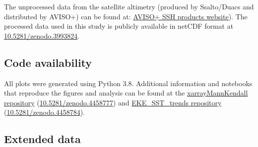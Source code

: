 \documentclass{nature}
\begin{document}
The unprocessed data from the satellite altimetry (produced by Ssalto/Duacs and distributed by AVISO+) can be found at: \href{https://www.aviso. altimetry.fr/en/data/products/sea‐surface‐height‐products/global/gridded‐sea‐level‐heights‐and‐derived‐ variables.html}{AVISO+ SSH products website}). The processed data used in this study is publicly available in netCDF format at \href{https://doi.org/10.5281/zenodo.3993824}{10.5281/zenodo.3993824}. 

\subsection{Code availability}\mbox{}\vspace{-1.5em}

All plots were generated using Python 3.8. Additional information and notebooks that reproduce the figures and analysis can be found at the \href{https://github.com/josuemtzmo/xarrayMannKendall}{xarrayMannKendall repository} (\href{https://doi.org/10.5281/zenodo.4458777}{10.5281/zenodo.4458777}) and \href{https://github.com/josuemtzmo/EKE\_SST\_trends}{EKE\_SST\_trends repository} (\href{https://doi.org/10.5281/zenodo.4458784}{10.5281/zenodo.4458784}).



\newpage
{}
\subsection{Extended data}\mbox{}\vspace{-1.5em}
\setcounter{figure}{0}   
\end{document}
